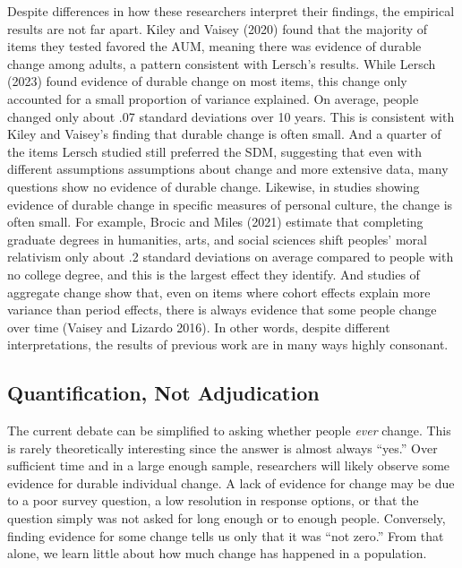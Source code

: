\documentclass[
  12pt,
]{article}
\begin{document}
Despite differences in how these researchers interpret their findings,
the empirical results are not far apart. Kiley and Vaisey (2020) found
that the majority of items they tested favored the AUM, meaning there
was evidence of durable change among adults, a pattern consistent with
Lersch's results. While Lersch (2023) found evidence of durable change
on most items, this change only accounted for a small proportion of
variance explained. On average, people changed only about .07 standard
deviations over 10 years. This is consistent with Kiley and Vaisey's
finding that durable change is often small. And a quarter of the items
Lersch studied still preferred the SDM, suggesting that even with
different assumptions assumptions about change and more extensive data,
many questions show no evidence of durable change. Likewise, in studies
showing evidence of durable change in specific measures of personal
culture, the change is often small. For example, Brocic and Miles (2021)
estimate that completing graduate degrees in humanities, arts, and
social sciences shift peoples' moral relativism only about .2 standard
deviations on average compared to people with no college degree, and
this is the largest effect they identify. And studies of aggregate
change show that, even on items where cohort effects explain more
variance than period effects, there is always evidence that some people
change over time (Vaisey and Lizardo 2016). In other words, despite
different interpretations, the results of previous work are in many ways
highly consonant.

\hypertarget{quantification-not-adjudication}{%
\subsection{Quantification, Not
Adjudication}\label{quantification-not-adjudication}}

The current debate can be simplified to asking whether people
\emph{ever} change. This is rarely theoretically interesting since the
answer is almost always ``yes.'' Over sufficient time and in a large
enough sample, researchers will likely observe some evidence for durable
individual change. A lack of evidence for change may be due to a poor
survey question, a low resolution in response options, or that the
question simply was not asked for long enough or to enough people.
Conversely, finding evidence for some change tells us only that it was
``not zero.'' From that alone, we learn little about how much change has
happened in a population.
\end{document}
